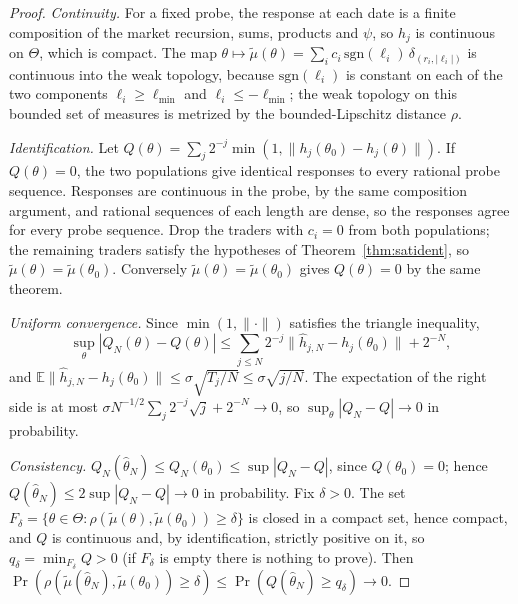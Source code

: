 \documentclass[12pt]{article}
\theoremstyle{definition}
\theoremstyle{remark}
\begin{document}
\begin{proof}
\emph{Continuity.} For a fixed probe, the response at each date is a finite composition of the market recursion, sums, products and $\psi$, so $h_j$ is continuous on $\Theta$, which is compact. The map $\theta\mapsto\tilde\mu(\theta)=\sum_ic_i\,\mathrm{sgn}(\ell_i)\,\delta_{(r_i,|\ell_i|)}$ is continuous into the weak topology, because $\mathrm{sgn}(\ell_i)$ is constant on each of the two components $\ell_i\ge\ell_{\min}$ and $\ell_i\le-\ell_{\min}$; the weak topology on this bounded set of measures is metrized by the bounded-Lipschitz distance $\rho$.

\emph{Identification.} Let $Q(\theta)=\sum_j2^{-j}\min(1,\|h_j(\theta_0)-h_j(\theta)\|)$. If $Q(\theta)=0$, the two populations give identical responses to every rational probe sequence. Responses are continuous in the probe, by the same composition argument, and rational sequences of each length are dense, so the responses agree for every probe sequence. Drop the traders with $c_i=0$ from both populations; the remaining traders satisfy the hypotheses of Theorem~\ref{thm:satident}, so $\tilde\mu(\theta)=\tilde\mu(\theta_0)$. Conversely $\tilde\mu(\theta)=\tilde\mu(\theta_0)$ gives $Q(\theta)=0$ by the same theorem.

\emph{Uniform convergence.} Since $\min(1,\|\cdot\|)$ satisfies the triangle inequality,
\[
 \sup_\theta|Q_N(\theta)-Q(\theta)|\le\sum_{j\le N}2^{-j}\|\hat h_{j,N}-h_j(\theta_0)\|+2^{-N},
\]
and $\mathbb E\|\hat h_{j,N}-h_j(\theta_0)\|\le\sigma\sqrt{T_j/N}\le\sigma\sqrt{j/N}$. The expectation of the right side is at most $\sigma N^{-1/2}\sum_j2^{-j}\sqrt j+2^{-N}\to0$, so $\sup_\theta|Q_N-Q|\to0$ in probability.

\emph{Consistency.} $Q_N(\hat\theta_N)\le Q_N(\theta_0)\le\sup|Q_N-Q|$, since $Q(\theta_0)=0$; hence $Q(\hat\theta_N)\le2\sup|Q_N-Q|\to0$ in probability. Fix $\delta>0$. The set $F_\delta=\{\theta\in\Theta:\rho(\tilde\mu(\theta),\tilde\mu(\theta_0))\ge\delta\}$ is closed in a compact set, hence compact, and $Q$ is continuous and, by identification, strictly positive on it, so $q_\delta=\min_{F_\delta}Q>0$ (if $F_\delta$ is empty there is nothing to prove). Then $\Pr(\rho(\tilde\mu(\hat\theta_N),\tilde\mu(\theta_0))\ge\delta)\le\Pr(Q(\hat\theta_N)\ge q_\delta)\to0$.
\end{proof}
\end{document}
